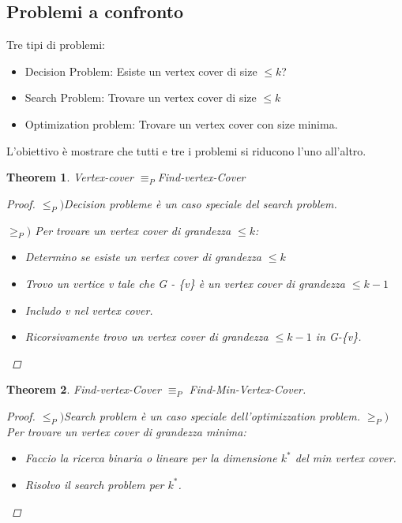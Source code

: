 \documentclass{article}
\newtheorem{theorem}{Theorem}[subsection]
\begin{document}
\subsection{Problemi a confronto}
Tre tipi di problemi:
\begin{itemize}
    \item Decision Problem: Esiste un vertex cover di size $\leq k$?
    \item Search Problem: Trovare un vertex cover di size $\leq k$
    \item Optimization problem: Trovare un vertex cover con size minima.
\end{itemize}
L'obiettivo è  mostrare che tutti e tre i problemi si riducono l'uno all'altro.
\begin{theorem}
    Vertex-cover $\equiv_P$Find-vertex-Cover
    \begin{proof}
        $\leq_P)$Decision probleme è un caso speciale del search problem.

        \noindent $\geq_P)$ Per trovare un vertex cover di grandezza $\leq k$:
        \begin{itemize}
            \item Determino se esiste un vertex cover di grandezza $\leq k$
            \item Trovo un vertice v tale che G - \{v\} è un vertex cover di grandezza $\leq k-1$
            \item  Includo v nel vertex cover.
            \item Ricorsivamente trovo un vertex cover di grandezza $\leq k-1$ in G-\{v\}.
        \end{itemize}     
    \end{proof}
\end{theorem}
\begin{theorem}
     Find-vertex-Cover $\equiv_P$ Find-Min-Vertex-Cover.
     \begin{proof}
           $\leq_P)$Search problem è un caso speciale dell'optimizzation problem.
        \noindent $\geq_P)$ Per trovare un vertex cover di grandezza minima:
        \begin{itemize}
            \item Faccio la ricerca binaria o lineare per la dimensione $k^*$ del min vertex cover.
            \item Risolvo il search problem per $k^*$.
        \end{itemize}  
     \end{proof}
\end{theorem}
\newpage
\end{document}

